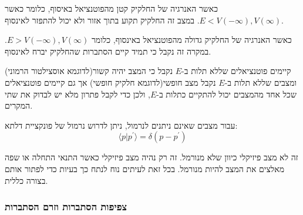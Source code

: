 \documentclass{tstextbook}
\begin{document}
\begin{definition}
כאשר האנרגיה של החלקיק קטן מהפוטנציאל באיסוף, כלומר כאשר \(E<V\left( -\infty \right),V\left( \infty \right)\). במצב זה החלקיק תקוע בתוך אזור ולא יכול להתפזר לאינסוף.

\end{definition}
\begin{definition}
כאשר האנרגיה של החלקיק גדולה מהפוטנציאל באינסוף, כלומר \(E>V\left( -\infty \right),V\left( \infty \right)\). במקרה זה נקבל כי תמיד קיים הסתברות שהחלקיק יברח לאינסוף.

\end{definition}
\begin{remark}
קיימים פוטנציאלים שללא תלות ב-\(E\) נקבל כי המצב יהיה קשור(לדוגמא אוסצילטור הרמוני) ומצבים שללא תלות ב-\(E\) נקבל מצב חופשי(לדוגמא חלקיק חופשי) אך גם קיימים פוטנציאלים שכל אחד מהמצבים יכול להתקיים כתלות ב-\(E\), ולכן כדי לקבל פתרון מלא יש לבדוק את שתי המקרים.

\end{remark}
\begin{definition}
עבור מצבים שאינם ניתנים לנרמול, ניתן לדרוש נרמול של פונקציית דלתא:
$$\langle p|p^{\prime}\rangle=\delta(p-p^{\prime})$$

\end{definition}
\begin{remark}
זה לא מצב פיזיקלי כיוון שלא מנורמל. זה רק נהיה מצב פיזיקלי כאשר התנאי התחלה או שפה מאלצים את המצב להיות מנורמל. בכל זאת לעיתים נוח לנתח כך בעיות כדי לפתור אותם בצורה כללית.

\end{remark}
\subsubsection{צפיפות הסתברות וזרם הסתברות}
\end{document}
